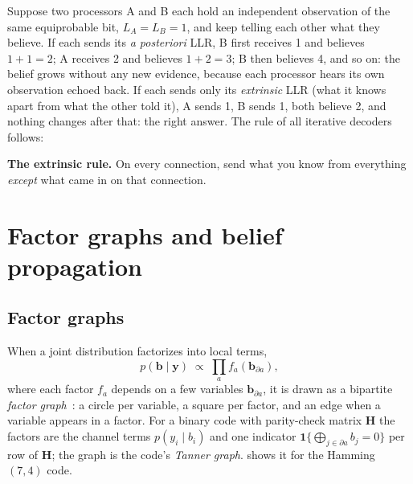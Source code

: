 \documentclass[11pt,a4paper]{article}
\theoremstyle{definition}
\theoremstyle{remark}
\newenvironment{keybox}{\begin{center}\begin{lrbox}{\keyboxbin}\begin{minipage}{0.92\textwidth}}{\end{minipage}\end{lrbox}\setlength{\fboxsep}{8pt}\fcolorbox{icemagenta}{iceground}{\usebox{\keyboxbin}}\end{center}}
\begin{document}
Suppose two processors A and B each hold an independent observation of the same equiprobable bit, $L_A = L_B = 1$, and keep telling each other what they believe. If each sends its \emph{a posteriori} LLR, B first receives 1 and believes $1+1=2$; A receives 2 and believes $1+2=3$; B then believes 4, and so on: the belief grows without any new evidence, because each processor hears its own observation echoed back. If each sends only its \emph{extrinsic} LLR (what it knows apart from what the other told it), A sends 1, B sends 1, both believe 2, and nothing changes after that: the right answer. The rule of all iterative decoders follows:
\begin{keybox}
\textbf{The extrinsic rule.} On every connection, send what you know from everything \emph{except} what came in on that connection.
\end{keybox}

\section{Factor graphs and belief propagation}
\label{sec:bp}

\subsection{Factor graphs}

When a joint distribution factorizes into local terms,
\begin{equation}
  p(\bm{b}\mid\bm{y}) \;\propto\; \prod_a f_a(\bm{b}_{\partial a}),
\end{equation}
where each factor $f_a$ depends on a few variables $\bm{b}_{\partial a}$, it is drawn as a bipartite \emph{factor graph}~\cite{kschischang}: a circle per variable, a square per factor, and an edge when a variable appears in a factor. For a binary code with parity-check matrix $\bm{H}$ the factors are the channel terms $p(y_i\mid b_i)$ and one indicator $\mathbf{1}\{\bigoplus_{j\in\partial a} b_j = 0\}$ per row of $\bm{H}$; the graph is the code's \emph{Tanner graph}.  shows it for the Hamming $(7,4)$ code.
\end{document}
